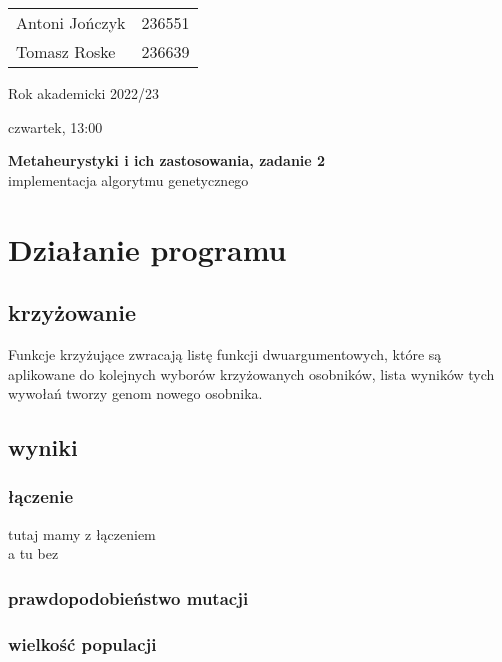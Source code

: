 \documentclass{article}
\begin{document}
\begin{minipage}{0.35\linewidth}
	\begin{tabular}{lr}
		Antoni Jończyk & 236551 \\
		Tomasz Roske   & 236639
	\end{tabular} \hfill
\end{minipage}
\hfill
\begin{minipage}{0.35\linewidth}
	\hfill Rok akademicki 2022/23 \par
	\hfill czwartek, 13:00
\end{minipage}
\bigskip \bigskip \bigskip \bigskip \bigskip
\begin{center}
	\textbf{Metaheurystyki i ich zastosowania, zadanie 2}\\
	\bigskip
	\large implementacja algorytmu genetycznego
\end{center}
\bigskip \bigskip
\section{Działanie programu}
\subsection{krzyżowanie}
Funkcje krzyżujące zwracają listę funkcji dwuargumentowych, które są aplikowane
do kolejnych wyborów krzyżowanych osobników, lista wyników tych wywołań tworzy
genom nowego osobnika.
\newpage



\subsection{wyniki}
\subsubsection{łączenie}
tutaj mamy z łączeniem \\

a tu bez \\

\subsubsection{prawdopodobieństwo mutacji}






\subsubsection{wielkość populacji}









\end{document}

